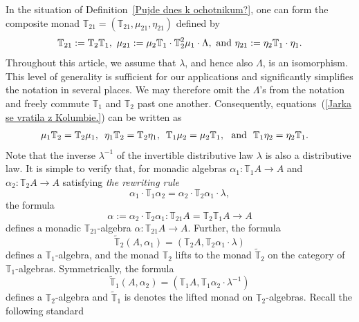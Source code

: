 \documentclass[12pt,leqno]{amsart}
\theoremstyle{definition}
\def\T{\mathbb{T}}
\newcommand{\4}{\texttt{4}}
\begin{document}
In the situation of Definition~\ref{Pujde dnes k ochotnikum?}, one can form
the composite monad $\T_{21} = (\T_{21},\mu_{21},\eta_{21})$
defined by
\[
\T_{21} :=  \T_2\T_1, \ \mu_{21} := \mu_2 \T_1 \cdot \T^2_2 \mu_1 \cdot \Lambda, \
\hbox {and } \eta_{21} := \eta_2\T_1 \cdot \eta_1. 
\]
Throughout this article, we assume that $\lambda$, and hence also
$\Lambda$, is an isomorphism. This level of generality is sufficient
for our applications and significantly simplifies the notation in
several places.
We may therefore omit the $\Lambda$'s from the notation and freely
commute $\T_1$ and $\T_2$ past one another. Consequently,
equations~(\ref{Jarka se vratila z Kolumbie.}) can be written as
\begin{align}
\label{Jdu si koupit podlozky.}
\mu_1\T_2 = \T_2 \mu_1,
\hskip .5em
\eta_1\T_2 = \T_2 \eta_1, \hskip .5em   
\T_1\mu_2 = \mu_2 \T_1, \
\hbox { and } \
&\T_1\eta_2 = \eta_2 \T_1.
\end{align}
  Note that the inverse $\lambda^{-1}$ of the invertible distributive law $\lambda$ is also a distributive law.
It is simple to verify that,  for monadic 
algebras $\alpha_1 : \T_1 A \to A$ and  
$\alpha_2 : \T_2 A \to A$ satisfying {\/\em the rewriting rule\/}
\begin{equation}
\label{Jaruska ma uzeh.}
\alpha_1 \cdot \T_1\alpha_2 = \alpha_2 \cdot \T_2 \alpha_1 \cdot \lambda ,
\end{equation}
the formula 
\begin{equation}
\label{Dnes divadlo vynecha.}
\alpha := \alpha_2 \cdot \T_2\alpha_1  : \T_{21} A = \T_2 \T_1 A
\longrightarrow A
\end{equation}
defines a monadic
$\T_{21}$-algebra $\alpha : \T_{21} A \to A$.
Further, 
the formula
\begin{equation}\label{equation:lifted_T_2}
\widetilde{\T}_2(A, \alpha_1)=(\T_2A,\T_2\alpha_1\cdot\lambda)
\end{equation}
defines a $\T_1$-algebra, and the monad ${\T}_2$ lifts to the monad
$\widetilde{\T}_2$ on the category of $\T_1$-algebras.  Symmetrically,
the formula
\begin{equation}\label{equation:lifted_T_1}
\widetilde{\T}_1(A, \alpha_2)=(\T_1 A,\T_1\alpha_2\cdot\lambda^{-1})
\end{equation}
defines a $\T_2$-algebra and $\widetilde{\T}_1$ is denotes the lifted
monad on $\T_2$-algebras. Recall the following standard
\end{document}
